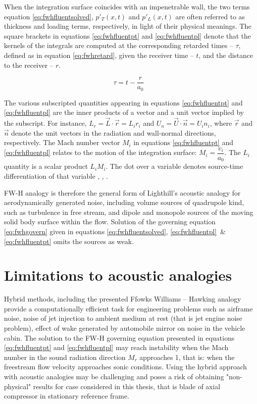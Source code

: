 When the integration surface coincides with an impenetrable wall, the two terms equation \ref{eq:fwhfluentsolved}, $ p'_T(x, t)$ and $p'_L(x, t)$ are often referred to as thickness and loading terms, respectively, in light of their physical meanings. The square brackets in equations \ref{eq:fwhfluentpt} and \ref{eq:fwhfluentpl} denote that the kernels of the integrals are computed at the corresponding retarded times -- $\tau$, defined as in equation \ref{eq:fwhretard}, given the receiver time -- $t$, and the distance to the receiver -- $r$.

\begin{equation} \label{eq:fwhretard}
\tau = t - \frac{r}{a_0}
\end{equation}

The various subscripted quantities appearing in equations \ref{eq:fwhfluentpt} and \ref{eq:fwhfluentpl} are the inner products of a vector and a unit vector implied by the subscript. For instance, $L_r = \vec{L} \cdot \vec{r} = L_i r_i$ and $U_n = \vec{U} \cdot \vec{n} = U_i n_i$, where $\vec{r}$ and $\vec{n}$ denote the unit vectors in the radiation and wall-normal directions, respectively. The Mach number vector $M_i$ in equations \ref{eq:fwhfluentpt} and \ref{eq:fwhfluentpl} relates to the motion of the integration surface: $M_i = \dfrac{v_i}{a_0}$. The $L_i$ quantity is a scalar product $L_i M_i$. The dot over a variable denotes source-time differentiation of that variable \citep{fluenttheory}, \citep{FWH}, \citep{fwhaiaa}.

FW-H analogy is therefore the general form of Lighthill's acoustic analogy for aerodynamically generated noise, including volume sources of quadrupole kind, such as turbulence in free stream, and dipole and monopole sources of the moving solid body surface within the flow. Solution of the governing equation \ref{eq:fwhgovern} given in equations \ref{eq:fwhfluentsolved}, \ref{eq:fwhfluentpl}~\& \ref{eq:fwhfluentpt} omits the sources as weak. 

\section{Limitations to acoustic analogies}
Hybrid methods, including the presented Ffowks Williams -- Hawking analogy provide a computationally efficient task for engineering problems such as airframe noise, noise of jet injection to ambient medium at rest (that is jet engine noise problem), effect of wake generated by automobile mirror on noise in the vehicle cabin. The solution to the FW-H governing equation presented in equations \ref{eq:fwhfluentpt} and \ref{eq:fwhfluentpl} may reach instability when the Mach number in the sound radiation direction $M_r$ approaches 1, that is: when the freestream flow velocity approaches sonic conditions. Using the hybrid approach with acoustic analogies may be challenging and poses a risk of obtaining "non-physical" results for case considered in this thesis, that is blade of axial compressor in stationary reference frame.

